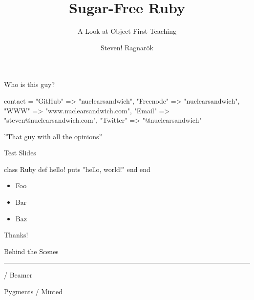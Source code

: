 \documentclass[20pt,draft]{beamer}
\author{Steven! Ragnarök}
\title{Sugar-Free Ruby}
\subtitle{A Look at Object-First Teaching}
\date{}
\begin{document}
\begin{frame}
	\titlepage
\end{frame}

\begin{frame}[fragile]
	\begin{center}
		{
			Who is this guy?
		}
		\vspace{1cm}

		\insertauthor
	\end{center}
\begin{ruby10pt}
contact = {
  "GitHub"   =>        "nuclearsandwich",
  "Freenode" =>        "nuclearsandwich",
  "WWW"      =>    "www.nuclearsandwich.com",
  "Email"    => "steven@nuclearsandwich.com",
  "Twitter"  =>       "@nuclearsandwich"
}
\end{ruby10pt}

\begin{center}
	''That guy with all the opinions''
\end{center}
\end{frame}

\begin{section}{Test Slides}
\begin{frame}[fragile]
\begin{rubycode}
class Ruby
  def hello!
    puts "hello, world!"
  end
end
\end{rubycode}
\end{frame}

\begin{frame}
	\begin{itemize}
		\item Foo
		\item Bar
		\item Baz
	\end{itemize}
\end{frame}
\end{section}

\begin{frame}
	\begin{center}
		\vspace{2.5cm}
		{ Thanks! }
		\vspace{1.5cm}

		Behind the Scenes
		\par\rule[3mm]{3cm}{0.1mm}

			\XeLaTeX / Beamer

			Pygments / Minted
	\end{center}
\end{frame}
\end{document}
